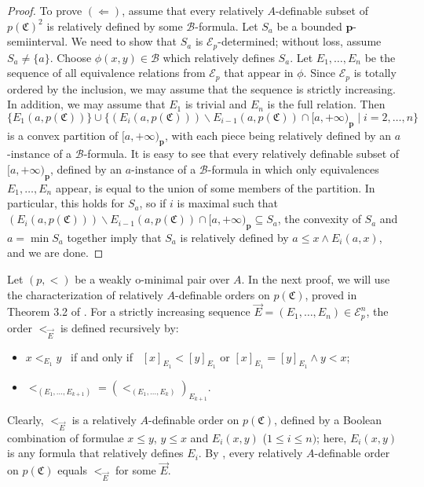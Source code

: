 \documentclass{amsart}
\theoremstyle{definition}
\theoremstyle{definition}
\newcommand{\Mon}{\mathfrak C}
\begin{document}
\begin{proof}
To prove $(\Leftarrow)$, assume that every relatively $A$-definable subset of $p(\Mon)^2$ is relatively defined by some $\mathcal B$-formula. Let $S_a$ be a bounded $\mathbf p$-semiinterval. We need to show that $S_a$ is $\mathcal E_p$-determined; without loss, assume $S_a\neq \{a\}$. 
Choose $\phi(x,y)\in \mathcal B$ which relatively defines $S_a$. Let $E_1,\dots,E_n$ be the sequence of all equivalence relations from $\mathcal E_p$ that appear in $\phi$. Since $\mathcal E_p$ is totally ordered by the inclusion, we may assume that the sequence is strictly increasing. In addition, we may assume that $E_1$ is trivial and $E_n$ is the full relation. Then
\[ \{E_1(a,p(\Mon))\}\cup\{(E_i(a,p(\Mon)))\smallsetminus E_{i-1}(a,p(\Mon))\cap [a,+\infty)_{\mathbf p}\mid i=2,\dots,n\}\] 
is a convex partition of $[a,+\infty)_\mathbf p$, with each piece being relatively defined by an $a$-instance of a $\mathcal B$-formula. It is easy to see that every relatively definable subset of $[a,+\infty)_{\mathbf p}$, defined by an $a$-instance of a $\mathcal{B}$-formula in which only equivalences $E_1,\dots,E_n$ appear, is equal to the union of some members of the partition. In particular, this holds for $S_a$, so if $i$ is maximal such that $(E_i(a,p(\Mon)))\smallsetminus E_{i-1}(a,p(\Mon))\cap [a,+\infty)_{\mathbf p}\subseteq S_a$, the convexity of $S_a$ and $a=\min S_a$ together imply that $S_a$ is relatively defined by $a\leqslant x\land E_i(a,x)$, and we are done.
\end{proof}




Let $(p,<)$ be a weakly o-minimal pair over $A$. In the next proof, we will use the characterization of relatively $A$-definable orders on $p(\Mon)$, proved in Theorem 3.2 of \cite{MTwom}. For a strictly increasing sequence $\vec E=(E_1,\dots,E_n)\in \mathcal E_p^n$, the order $<_{\vec E}$ is defined recursively by: 
\begin{itemize}
    \item $x<_{E_1}y $ \ if and only if \ $[x]_{E_1}<[y]_{E_1}$ or $[x]_{E_1}=[y]_{E_1}\land y<x$;
    \item $<_{(E_1,\dots,E_{k+1})}=\left(<_{(E_1,\dots,E_k)}\right )_{E_{k+1}}$.
\end{itemize}
Clearly, $<_{\vec E}$ is a relatively $A$-definable order on $p(\Mon)$,  defined by a Boolean combination of formulae $x\leqslant y$, $y\leqslant x$ and $E_i(x,y)$ ($1\leqslant i\leqslant n)$; here, $E_i(x,y)$ is any formula that relatively defines $E_i$.   
By \cite[Theorem 3.2]{MTwom}, every relatively $A$-definable order on $p(\Mon)$ equals $<_{\vec E}$ for some $\vec E$. 
 
\end{document}
